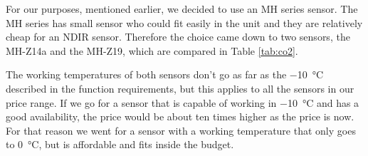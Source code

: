 \documentclass[a4paper,oneside]{book}
\begin{document}
For our purposes, mentioned earlier,  we decided to use an MH series 
sensor. The MH series has small sensor who could fit easily in the unit and
they are relatively cheap for an NDIR  sensor. Therefore the choice
came down to two sensors, the MH-Z14a and the MH-Z19, which are compared in
Table \ref{tab:co2}.

\begin{table}[]
\centering
{}
\caption{Comparison of  sensors \protect\cite{mh-z14a} \protect\cite{mh-z19}}
\label{tab:co2}
\end{table}

The working temperatures of both sensors don't go as far as the
\SI{-10}{\celsius} described
in the function requirements, but this applies to all the sensors in our price
range. If we go for a  sensor that is capable of working in
\SI{-10}{\celsius} and has a
good availability, the price would be about ten times higher as the price is
now. For that reason we went for a sensor with a working temperature that only
goes to \SI{0}{\celsius}, but is affordable and fits inside the budget.
\end{document}
